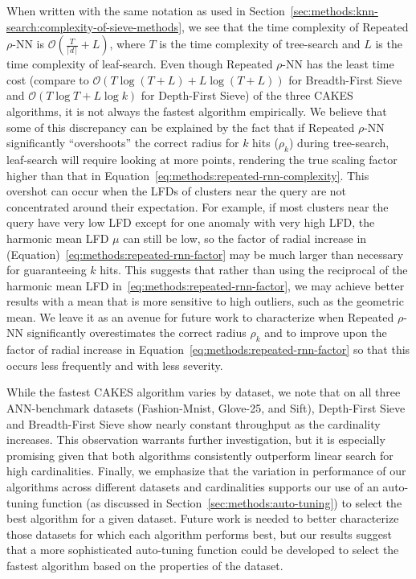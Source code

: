 When written with the same notation as used in Section~\ref{sec:methods:knn-search:complexity-of-sieve-methods}, we see that the time complexity of Repeated $\rho$-NN is $\mathcal{O}(\tfrac{T}{\lceil d \rceil} + L)$, where $T$ is the time complexity of tree-search and $L$ is the time complexity of leaf-search.
Even though Repeated $\rho$-NN has the least time cost (compare to $\mathcal{O}(T\log{(T+L)} + L\log{(T+L)})$ for Breadth-First Sieve and $\mathcal{O}(T\log{T} + L\log{k})$ for Depth-First Sieve) of the three CAKES algorithms, it is not always the fastest algorithm empirically.
We believe that some of this discrepancy can be explained by the fact that if Repeated $\rho$-NN significantly ``overshoots'' the correct radius for $k$ hits ($\rho_k$) during tree-search, leaf-search will require looking at more points, rendering the true scaling factor higher than that in Equation~\ref{eq:methods:repeated-rnn-complexity}.
This overshot can occur when the LFDs of clusters near the query are not concentrated around their expectation.
For example, if most clusters near the query have very low LFD except for one anomaly with very high LFD,
the harmonic mean LFD $\mu$ can still be low, so the factor of radial increase in (Equation)~\ref{eq:methods:repeated-rnn-factor} may be much larger than necessary for guaranteeing $k$ hits.
This suggests that rather than using the reciprocal of the harmonic mean LFD in~\ref{eq:methods:repeated-rnn-factor}, we may achieve better results with a mean that is more sensitive to high outliers, such as the geometric mean.
We leave it as an avenue for future work to characterize when Repeated $\rho$-NN significantly overestimates the correct radius $\rho_k$ and to improve upon the factor of radial increase in Equation~\ref{eq:methods:repeated-rnn-factor} so that this occurs less frequently and with less severity.

While the fastest CAKES algorithm varies by dataset, we note that on all three ANN-benchmark datasets (Fashion-Mnist, Glove-25, and Sift), Depth-First Sieve and Breadth-First Sieve show nearly constant throughput as the cardinality increases.
This observation warrants further investigation, but it is especially promising given that both algorithms consistently outperform linear search for high cardinalities.
Finally, we emphasize that the variation in performance of our algorithms across different datasets and cardinalities supports our use of an auto-tuning function (as discussed in Section~\ref{sec:methods:auto-tuning}) to select the best algorithm for a given dataset.
Future work is needed to better characterize those datasets for which each algorithm performs best, but our results suggest that a more sophisticated auto-tuning function could be developed to select the fastest algorithm based on the properties of the dataset.

